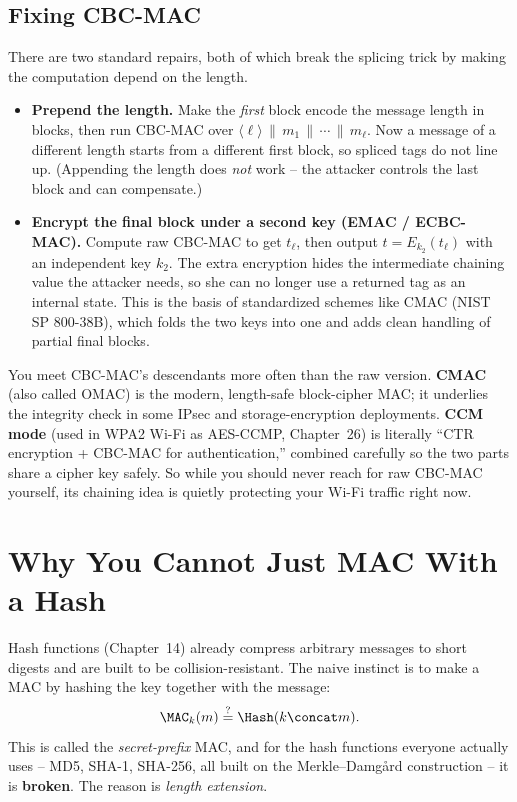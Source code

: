 \subsection{Fixing CBC-MAC}
\label{ch15:cbcmac-fix}

There are two standard repairs, both of which break the splicing trick by making the computation depend on the length.

\begin{itemize}
  \item \textbf{Prepend the length.} Make the \emph{first} block encode the message length in blocks, then run CBC-MAC over $\langle\ell\rangle \,\|\, m_1\,\|\,\cdots\,\|\,m_\ell$. Now a message of a different length starts from a different first block, so spliced tags do not line up. (Appending the length does \emph{not} work -- the attacker controls the last block and can compensate.)
  \item \textbf{Encrypt the final block under a second key (EMAC / ECBC-MAC).} Compute raw CBC-MAC to get $t_\ell$, then output $t = E_{k_2}(t_\ell)$ with an independent key $k_2$. The extra encryption hides the intermediate chaining value the attacker needs, so she can no longer use a returned tag as an internal state. This is the basis of standardized schemes like CMAC (NIST SP 800-38B), which folds the two keys into one and adds clean handling of partial final blocks.
\end{itemize}

\begin{applicationbox}
You meet CBC-MAC's descendants more often than the raw version. \textbf{CMAC} (also called OMAC) is the modern, length-safe block-cipher MAC; it underlies the integrity check in some IPsec and storage-encryption deployments. \textbf{CCM mode} (used in WPA2 Wi-Fi as AES-CCMP, Chapter~26) is literally ``CTR encryption + CBC-MAC for authentication,'' combined carefully so the two parts share a cipher key safely. So while you should never reach for raw CBC-MAC yourself, its chaining idea is quietly protecting your Wi-Fi traffic right now.
\end{applicationbox}

\section{Why You Cannot Just MAC With a Hash}
\label{ch15:length-extension}

Hash functions (Chapter~14) already compress arbitrary messages to short digests and are built to be collision-resistant. The naive instinct is to make a MAC by hashing the key together with the message:
\[
  \MAC_k(m) \stackrel{?}{=} \Hash(k \concat m).
\]
This is called the \emph{secret-prefix} MAC, and for the hash functions everyone actually uses -- MD5, SHA-1, SHA-256, all built on the Merkle--Damg\aa{}rd construction -- it is \textbf{broken}. The reason is \emph{length extension}.

